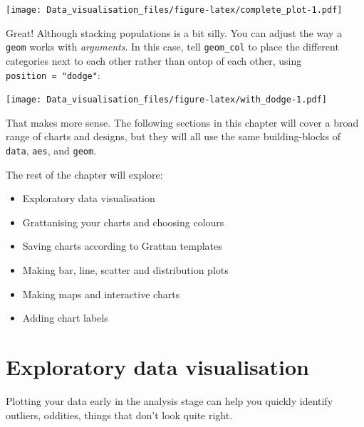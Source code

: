 \documentclass[]{book}
\newenvironment{Shaded}{\begin{snugshade}}{\end{snugshade}}
\newcommand{\DataTypeTok}[1]{\textcolor[rgb]{0.13,0.29,0.53}{#1}}
\newcommand{\KeywordTok}[1]{\textcolor[rgb]{0.13,0.29,0.53}{\textbf{#1}}}
\newcommand{\NormalTok}[1]{#1}
\newcommand{\OperatorTok}[1]{\textcolor[rgb]{0.81,0.36,0.00}{\textbf{#1}}}
\newcommand{\StringTok}[1]{\textcolor[rgb]{0.31,0.60,0.02}{#1}}
\providecommand{\tightlist}{%
  \setlength{\itemsep}{0pt}\setlength{\parskip}{0pt}}
\begin{document}
\texttt{[image: Data\_visualisation\_files/figure-latex/complete\_plot-1.pdf]}

Great! Although stacking populations is a bit silly. You can adjust the way a \texttt{geom} works with \emph{arguments}. In this case, tell \texttt{geom\_col} to place the different categories next to each other rather than ontop of each other, using \texttt{position\ =\ "dodge"}:

\begin{Shaded}
\end{Shaded}

\texttt{[image: Data\_visualisation\_files/figure-latex/with\_dodge-1.pdf]}

That makes more sense. The following sections in this chapter will cover a broad range of charts and designs, but they will all use the same building-blocks of \texttt{data}, \texttt{aes}, and \texttt{geom}.

The rest of the chapter will explore:

\begin{itemize}
\tightlist
\item
  Exploratory data visualisation
\item
  Grattanising your charts and choosing colours
\item
  Saving charts according to Grattan templates
\item
  Making bar, line, scatter and distribution plots
\item
  Making maps and interactive charts
\item
  Adding chart labels
\end{itemize}

\hypertarget{exploratory-data-visualisation}{%
\section{Exploratory data visualisation}\label{exploratory-data-visualisation}}

Plotting your data early in the analysis stage can help you quickly identify outliers, oddities, things that don't look quite right.
\end{document}
